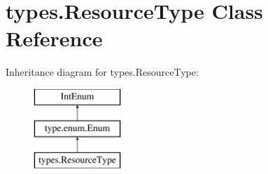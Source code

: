 \hypertarget{classtypes_1_1ResourceType}{}\section{types.\+Resource\+Type Class Reference}
\label{classtypes_1_1ResourceType}
Inheritance diagram for types.\+Resource\+Type\+:\begin{figure}[H]
\begin{center}
\leavevmode
\includegraphics[height=3.000000cm]{classtypes_1_1ResourceType}
\end{center}
\end{figure}
